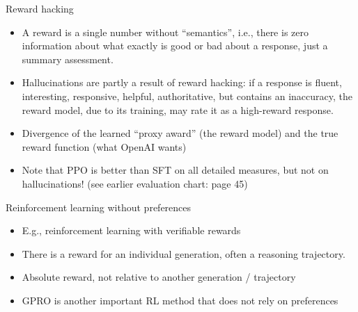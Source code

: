 \documentclass[11pt,compress,t,notes=noshow, xcolor=table]{beamer}
\begin{document}
\begin{vbframe}{Reward hacking}

\vfill


	\begin{itemize}
		\item
                A reward is a single number without
		``semantics'', i.e., there is zero
		information about what exactly is good or
		bad about a response, just a summary
		assessment.
                
\item Hallucinations are partly a result of reward
		hacking: if a response is fluent,
	interesting, responsive, helpful, authoritative, but
	contains an inaccuracy,
the reward model, due to its training, may rate it as a
	high-reward
        response.
        \item Divergence of the learned ``proxy award'' (the
	reward model) and the true reward function (what
	OpenAI wants)
        \item Note that PPO is better than SFT on all
	detailed measures, but not on hallucinations! (see
	earlier evaluation chart: page 45)
	\end{itemize}

\vfill

\end{vbframe}






\begin{vbframe}{Reinforcement learning without preferences}

\vfill


	\begin{itemize}
\item E.g., reinforcement learning with verifiable rewards
\item There is a reward for an individual generation,
often a reasoning trajectory.
\item Absolute reward, not relative to another generation /
trajectory
\item GPRO is another important RL method that does not rely
on preferences 
	\end{itemize}

\vfill

\end{vbframe}

\begin{vbframe}



\href{https://app.sli.do/event/7wNYYWYvT6pXZhmuu2yKvM}{}

\end{vbframe}
\end{document}
